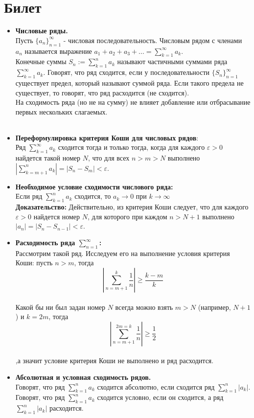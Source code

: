 \documentclass[12pt,a4paper]{article}
\begin{document}
\section{Билет}
\begin{itemize}
  \item \textbf{Числовые ряды.}\\
  Пусть $\{a_n\}_{n=1}^{\infty}$ - числовая последовательность. Числовым рядом с членами $a_n$ называется выражение $a_1 + a_2 + a_3 + ... =  \sum_{k = 1}^{\infty} a_k$.\\
  Конечные суммы $S_n := \sum_{k = 1}^n a_k$ называют частичными суммами ряда $\sum_{k = 1}^{\infty} a_k$. Говорят, что ряд сходится, если у последовательности $\{S_n\}_{n = 1}^{\infty}$ существует предел, который называют суммой ряда. Если такого предела не существует, то говорят, что ряд расходится (не сходится).\\
  На сходимость ряда (но не на сумму) не влияет добавление или отбрасывание первых нескольких слагаемых.\\
  \\
  \item \textbf{Переформулировка критерия Коши для числовых рядов}:\\
  Ряд $\sum_{k = 1}^{\infty} a_k$ сходится тогда и только тогда, когда для каждого $\varepsilon > 0$ найдется такой номер $N$, что для всех $n > m > N$ выполнено $|\sum_{k = m + 1}^n a_k| = |S_n - S_m| < \varepsilon$.\\
  \item \textbf{Необходимое условие сходимости числового ряда:}\\
  Если ряд $\sum_{k = 1}^n a_k$  сходится, то $a_k \to 0$ при $k \to \infty$\\
  \textbf{Доказательство:} Действительно, из критерия Коши следует, что для каждого $\varepsilon > 0$ найдется номер $N$, для которого при каждом $n > N + 1$ выполнено $|a_n| = |S_n - S_{n - 1}| < \varepsilon$.
  \item \textbf{Расходимость ряда $\sum_{n = 1}^{\infty}$:}\\
  Рассмотрим такой ряд. Исследуем его на выполнение условия критерия Коши: пусть $n > m$, тогда 
\[
  |\sum_{n = m + 1}^k \frac{1}{n}| \geq \frac{k - m}{k}
\]\\
  Какой бы ни был задан номер $N$ всегда можно взять $m > N$ (например, $N + 1$ ) и $k = 2m$, тогда 
\[
  |\sum_{n = m + 1}^{2m = k} \frac{1}{n}| \geq \frac{1}{2}
\]\\
  ,а значит условие критерия Коши не выполнено и ряд расходится.
\item \textbf{Абсолютная и условная сходимость рядов.} \\
Говорят, что ряд $\sum_{k = 1}^n a_k$ сходится абсолютно, если сходится ряд $\sum_{k = 1}^n |a_k|$.\\
Говорят, что ряд $\sum_{k = 1}^n a_k$ сходится условно, если он сходится, а ряд $\sum_{k = 1}^n |a_k|$ расходится.
\end{itemize}
\end{document}
